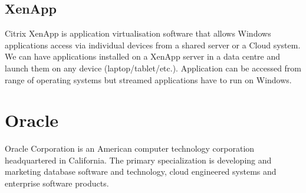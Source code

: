 \subsection{XenApp}
Citrix XenApp is application virtualisation software that allows Windows applications access via individual devices from a shared server or a Cloud system. We can have applications installed on a XenApp server in a data centre and launch them on any device (laptop/tablet/etc.). Application can be accessed from range of operating systems but streamed applications have to run on Windows.


\section{Oracle}
Oracle Corporation is an American computer technology corporation headquartered in California. The primary specialization is developing and marketing database software and technology, cloud engineered systems and enterprise software products.

